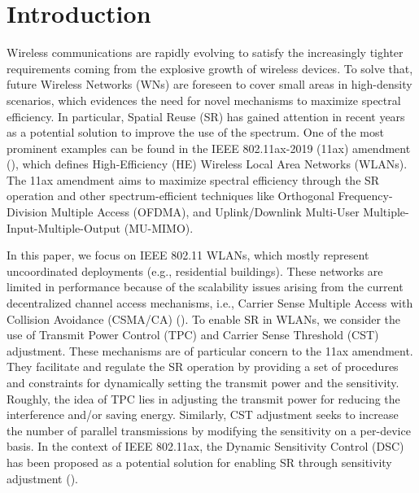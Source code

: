 \documentclass[preprint,12pt]{elsarticle}
\begin{document}
\newpage

\section{Introduction}
\label{section:introduction}
Wireless communications are rapidly evolving to satisfy the increasingly tighter requirements coming from the explosive growth of wireless devices. To solve that, future Wireless Networks (WNs) are foreseen to cover small areas in high-density scenarios, which evidences the need for novel mechanisms to maximize spectral efficiency. In particular, Spatial Reuse (SR) has gained attention in recent years as a potential solution to improve the use of the spectrum. One of the most prominent examples can be found in the IEEE 802.11ax-2019 (11ax) amendment (\citealp{bellalta2016ax}), which defines High-Efficiency (HE) Wireless Local Area Networks (WLANs). The 11ax amendment aims to maximize spectral efficiency through the SR operation and other spectrum-efficient techniques like Orthogonal Frequency-Division Multiple Access (OFDMA), and Uplink/Downlink Multi-User Multiple-Input-Multiple-Output (MU-MIMO).

In this paper, we focus on IEEE 802.11 WLANs, which mostly represent uncoordinated deployments (e.g., residential buildings). These networks are limited in performance because of the scalability issues arising from the current decentralized channel access mechanisms, i.e., Carrier Sense Multiple Access with Collision Avoidance (CSMA/CA) (\citealp{ergin2007understanding}). To enable SR in WLANs, we consider the use of Transmit Power Control (TPC) and Carrier Sense Threshold (CST) adjustment. These mechanisms are of particular concern to the 11ax amendment. They facilitate and regulate the SR operation by providing a set of procedures and constraints for dynamically setting the transmit power and the sensitivity. Roughly, the idea of TPC lies in adjusting the transmit power for reducing the interference and/or saving energy. Similarly, CST adjustment seeks to increase the number of parallel transmissions by modifying the sensitivity on a per-device basis. In the context of IEEE 802.11ax, the Dynamic Sensitivity Control (DSC) has been proposed as a potential solution for enabling SR through sensitivity adjustment (\citealp{smith2015dynamic}).
\end{document}
